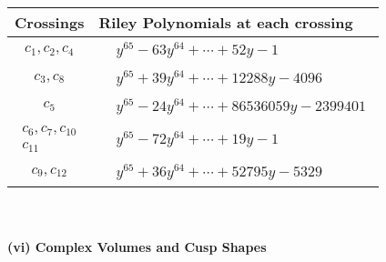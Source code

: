 \documentclass[1p]{elsarticle_modified}
\theoremstyle{definition}
\begin{document}
\begin{tabular}{m{50pt}|m{274pt}}
Crossings & \hspace{64pt}Riley Polynomials at each crossing \\
\hline $$\begin{aligned}c_{1},c_{2},c_{4}\end{aligned}$$&$\begin{aligned}
&y^{65}-63 y^{64}+\cdots+52 y-1
\end{aligned}$\\
\hline $$\begin{aligned}c_{3},c_{8}\end{aligned}$$&$\begin{aligned}
&y^{65}+39 y^{64}+\cdots+12288 y-4096
\end{aligned}$\\
\hline $$\begin{aligned}c_{5}\end{aligned}$$&$\begin{aligned}
&y^{65}-24 y^{64}+\cdots+86536059 y-2399401
\end{aligned}$\\
\hline $$\begin{aligned}c_{6},c_{7},c_{10}\\c_{11}\end{aligned}$$&$\begin{aligned}
&y^{65}-72 y^{64}+\cdots+19 y-1
\end{aligned}$\\
\hline $$\begin{aligned}c_{9},c_{12}\end{aligned}$$&$\begin{aligned}
&y^{65}+36 y^{64}+\cdots+52795 y-5329
\end{aligned}$\\
\hline
\end{tabular}\\~\\
\newpage\flushleft \textbf{(vi) Complex Volumes and Cusp Shapes}
\end{document}

